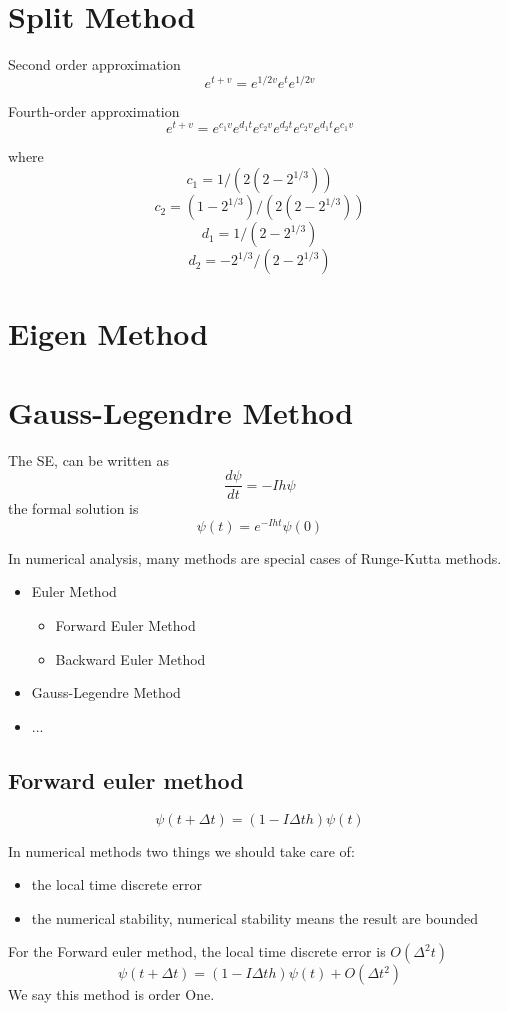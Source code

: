 \section{Split Method}

Second order approximation
$$
e^{t+v} = e^{1/2 v} e^{ t} e^{1/2 v}
$$

Fourth-order approximation
$$
e^{t+v} = e^{c_1 v} e^{d_1 t} e^{c_2 v} e^{d_2 t} e^{ c_2 v} e^{ d_1 t} e^{ c_1 v}
$$

where
$$
c_1 = 1/(2(2-2^{1/3}))
$$
$$
c_2 = (1-2^{1/3})/(2(2-2^{1/3}))
$$
$$
d_1 = 1/(2-2^{1/3})
$$
$$
d_2 = -2^{1/3}/(2-2^{1/3})
$$

\section{Eigen Method}

\section{Gauss-Legendre Method}
The SE, can be written as
$$
\frac{d\psi}{ dt} = - I h \psi
$$
the formal solution is
$$
\psi(t) = e^{ -I h t}\psi(0)
$$

In numerical analysis, many methods are special cases of Runge-Kutta methods.
\begin{itemize}
\item Euler Method
\begin{itemize}
    \item Forward Euler Method
    \item Backward Euler Method
\end{itemize}
\item Gauss-Legendre Method
\item ...
\end{itemize}

\subsection{Forward euler method}
$$
\psi(t + \Delta t) = (1 - I \Delta t h) \psi(t)
$$

In numerical methods two things we should take care of:
\begin{itemize}
\item the local time discrete error
\item the numerical stability, numerical stability means the result are bounded
\end{itemize}
For the Forward euler method, the local time discrete error is $O(\Delta ^2 t)$
$$
\psi(t + \Delta t) = (1 - I \Delta t h)\psi(t) + O(\Delta t^2)
$$
We say this method is order One.


